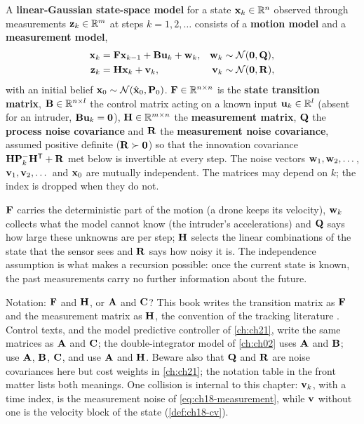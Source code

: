 \begin{definition}
\label{def:ch18-model}
A \textbf{linear-Gaussian state-space model}
for a state $\mathbf{x}_k\in\mathbb{R}^n$ observed through measurements $\mathbf{z}_k\in\mathbb{R}^m$ at
steps $k=1,2,\dots$ consists of a \textbf{motion model}
and a \textbf{measurement model},
\begin{align}
  \mathbf{x}_k &= \mathbf{F}\mathbf{x}_{k-1}+\mathbf{B}\mathbf{u}_k+\mathbf{w}_k, & \mathbf{w}_k&\sim\mathcal{N}(\mathbf{0},\mathbf{Q}),\label{eq:ch18-motion}\\
  \mathbf{z}_k &= \mathbf{H}\mathbf{x}_k+\mathbf{v}_k, & \mathbf{v}_k&\sim\mathcal{N}(\mathbf{0},\mathbf{R}),\label{eq:ch18-measurement}
\end{align}
with an initial belief $\mathbf{x}_0\sim\mathcal{N}(\hat{\mathbf{x}}_0,\mathbf{P}_0)$.
$\mathbf{F}\in\mathbb{R}^{n\times n}$ is the \textbf{state transition matrix},
$\mathbf{B}\in\mathbb{R}^{n\times l}$ the control matrix acting on a known input
$\mathbf{u}_k\in\mathbb{R}^l$ (absent for an intruder, $\mathbf{B}\mathbf{u}_k=\mathbf{0}$),
$\mathbf{H}\in\mathbb{R}^{m\times n}$ the \textbf{measurement matrix}, $\mathbf{Q}$ the
\textbf{process noise covariance} and $\mathbf{R}$ the
\textbf{measurement noise covariance}, assumed positive
definite ($\mathbf{R}\succ\mathbf{0}$) so that the innovation covariance
$\mathbf{H}\mathbf{P}^-_k\mathbf{H}^{\mathsf{T}}+\mathbf{R}$ met below is invertible at every step. The noise
vectors $\mathbf{w}_1,\mathbf{w}_2,\dots$, $\mathbf{v}_1,\mathbf{v}_2,\dots$ and
$\mathbf{x}_0$ are mutually independent. The matrices may depend on $k$; the index
is dropped when they do not.
\end{definition}

$\mathbf{F}$ carries the deterministic part of the motion (a drone keeps its
velocity), $\mathbf{w}_k$ collects what the model cannot know (the intruder's
accelerations) and $\mathbf{Q}$ says how large these unknowns are per step;
$\mathbf{H}$ selects the linear combinations of the state that the sensor sees
and $\mathbf{R}$ says how noisy it is. The independence assumption is what makes
a recursion possible: once the current state is known, the past measurements
carry no further information about the future.

\begin{notebox}{Notation: $\mathbf{F}$ and $\mathbf{H}$, or $\mathbf{A}$ and $\mathbf{C}$?}
This book writes the transition matrix as $\mathbf{F}$ and the measurement
matrix as $\mathbf{H}$, the convention of the tracking literature
\cite{barshalom2001estimation}. Control texts, and the model predictive
controller of \cref{ch:ch21}, write the same matrices as $\mathbf{A}$ and
$\mathbf{C}$; the double-integrator model of \cref{ch:ch02} uses $\mathbf{A}$ and
$\mathbf{B}$; \textcite{thrun2005probabilistic} use $\mathbf{A}$, $\mathbf{B}$,
$\mathbf{C}$, and \textcite{welch1995introduction} use $\mathbf{A}$ and $\mathbf{H}$.
Beware also that $\mathbf{Q}$ and $\mathbf{R}$ are noise covariances here but cost
weights in \cref{ch:ch21}; the notation table in the front matter lists both
meanings. One collision is internal to this chapter: $\mathbf{v}_k$, with a
time index, is the measurement noise of \cref{eq:ch18-measurement}, while
$\mathbf{v}$ without one is the velocity block of the state
(\cref{def:ch18-cv}).
\end{notebox}

